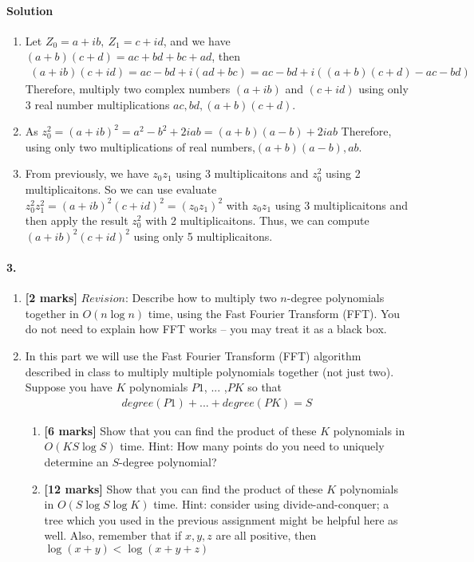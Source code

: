 \documentclass[a4paper]{scrartcl}
\begin{document}
\paragraph{Solution}
\begin{enumerate}[label=(\alph*)]
  \item Let $Z_0=a + ib,\ Z_1=c + id$, and we have $(a + b)(c + d) = ac + bd + bc + ad$, then
  \begin{align*}
   (a + ib)(c + id)=ac - bd + i(ad+bc) =ac - bd + i((a+b)(c+d)-ac-bd)
  \end{align*}
  Therefore, multiply two complex numbers $(a + ib)$ and $(c + id)$ using only 3 real number multiplications $ac, bd, (a + b)(c + d)$.
  \item  As $z_0^2=(a + ib)^2=a^2 -b^2 + 2iab =(a+b)(a-b) + 2iab$
   Therefore, using only two multiplications of real numbers,$(a+b)(a-b)  ,ab$.
  \item
  From previously, we have $z_0z_1$ using 3 multiplicaitons and $z_0^2$ using 2 multiplicaitons.
  So we can use evaluate $z_0^2z_1^2 =(a + ib)^2(c + id)^2= (z_0z_1)^2$ with $z_0z_1$ using 3 multiplicaitons and then apply the result $z_0^2$ with 2 multiplicaitons.
  Thus, we can compute $(a + ib)^2(c + id)^2$ using only 5 multiplicaitons.
\end{enumerate}
\paragraph{3.}
\label{sec:Question 3}
\begin{enumerate}[label=(\alph*)]
\item {\bfseries[2 marks]} $Revision$: Describe how to multiply two $n$-degree polynomials together in $O(n\log{n})$ time, using the Fast Fourier Transform (FFT). You do not need to explain how FFT works – you may treat it as a black box.
\item In this part we will use the Fast Fourier Transform (FFT) algorithm described in class to multiply multiple polynomials together (not just two). Suppose you have $K$ polynomials $P1$, ... ,$PK$ so that
\begin{align*}
  degree(P1 ) + ...  + degree(PK ) = S
\end{align*}
\begin{enumerate}[label=(\roman*)]
  \item {\bfseries[6 marks]} Show that you can find the product of these $K$ polynomials in $O(KS\log{S})$ time.
  Hint: How many points do you need to uniquely determine an $S$-degree polynomial?
  \item {\bfseries[12 marks]} Show that you can find the product of these $K$ polynomials in $O(S\log{S}\log{K})$ time.
  Hint: consider using divide-and-conquer; a tree which you used in the previous assignment might be helpful here as well. Also, remember that if $x,y,z$ are all positive, then $\log{(x + y)} < \log{(x + y + z)}$
\end{enumerate}
\end{enumerate}
\end{document}
